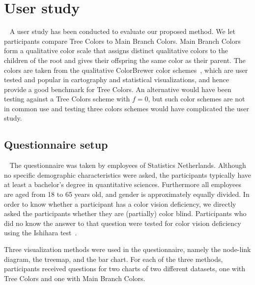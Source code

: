 \documentclass[journal]{vgtc}                %
\begin{document}
\section{User study}~\label{secuser}
A user study has been conducted to evaluate our proposed method. We let participants compare Tree Colors to Main Branch Colors. Main Branch Colors form a qualitative color scale that assigns distinct qualitative colors to the children of the root and gives their offspring the same color as their parent. The colors are taken from the qualitative ColorBrewer color schemes~\cite{brewer03}, which are user tested and popular in cartography and statistical visualizations, and hence provide a good benchmark for Tree Colors. An alternative would have been testing
against a Tree Colors scheme with $f=0$, but such color schemes are not in common 
use and testing three colors schemes would have complicated the user study.

\subsection{Questionnaire setup}~\label{secusersetup}
The questionnaire was taken by employees of Statistics Netherlands. Although no specific 
demographic characteristics were asked, the participants typically have at least a bachelor's degree in 
quantitative sciences. Furthermore all employees are aged from 18 to 65 years old, and gender is 
approximately equally divided. In order to know whether 
a participant has a color vision deficiency, we directly asked the participants 
whether they are (partially) color blind. Participants who did no know the answer
to that question were tested for 
color vision deficiency using the Ishihara test~\cite{ishihara}. 

Three visualization methods were used in the questionnaire, namely the node-link diagram, the treemap, and the bar chart. For each of the three methods, participants received questions for two charts of two different datasets, one with Tree Colors and one with Main Branch Colors. 
\end{document}
